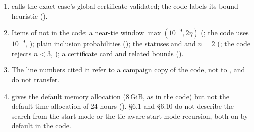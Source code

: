 \begin{enumerate}[leftmargin=1.8em]
     and  say such a run stops ().
  \item {} calls the exact case's global certificate validated; the code labels its bound
    heuristic ().
  \item Items of  not in the code: a near-tie window $\max(10^{-9},2\eta)$ (; the code uses
    $10^{-9}$, ); plain inclusion probabilities (); the statuses
     and  and $n=2$ (; the code rejects $n<3$,
    ); a certificate card and related bounds ().
  \item The line numbers cited in  refer to a campaign copy of the code, not to
    , and do not transfer.
  \item {} gives the default memory allocation (8\,GiB, as in the code) but not the default time
    allocation of 24 hours ().  \S6.1 and \S6.10 do not describe the search from the start mode or
    the tie-aware start-mode recursion, both on by default in the code.
\end{enumerate}


\fi

